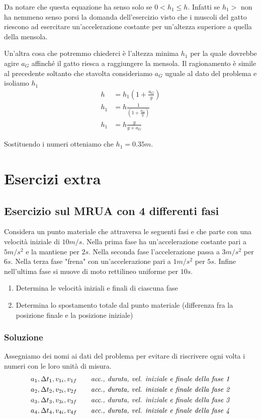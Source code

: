 \documentclass{article}
\begin{document}
Da notare che questa equazione ha senso solo se $0 < h_1 \le h$. Infatti se $h_1 >$ non ha nemmeno senso porsi la domanda dell'esercizio visto che i muscoli del gatto riescono ad esercitare un'accelerazione costante per un'altezza superiore a quella della mensola.

Un'altra cosa che potremmo chiederci è l'altezza minima $h_1$ per la quale dovrebbe agire $a_G$ affinché il gatto riesca a raggiungere la mensola. Il ragionamento è simile al precedente soltanto che stavolta consideriamo $a_G$ uguale al dato del problema e isoliamo $h_1$
\begin{align}
  h &= h_1\left(1+\frac{a_G}{g}\right) \\
  h_1 &= h \frac{1}{\left(1+\frac{a_G}{g}\right)} \\
  h_1 &= h \frac{g}{g+a_G}
\end{align}

Sostituendo i numeri otteniamo che $h_1=0.35m$.

\newpage
\section{Esercizi extra}

\subsection{Esercizio sul MRUA con 4 differenti fasi}
Considera un punto materiale che attraversa le seguenti fasi e che parte con una velocità iniziale di $10m/s$. 
Nella prima fase ha un'accelerazione costante pari a $5m/s^2$ e la mantiene per $2s$. Nella seconda fase l'accelerazione passa a $3m/s^2$ per $6s$. Nella terza fase "frena" con un'accelerazione pari a $1m/s^2$ per $5s$. Infine nell'ultima fase si muove di moto rettilineo uniforme per $10s$.
\begin{enumerate}
  \item Determina le velocità iniziali e finali di ciascuna fase
  \item Determina lo spostamento totale dal punto materiale (differenza fra la posizione finale e la posizione iniziale)
\end{enumerate}

\subsubsection{Soluzione}

Assegniamo dei nomi ai dati del problema per evitare di riscrivere ogni volta i numeri con le loro unità di misura. 
\begin{align}
  & a_1, \Delta t_1, v_{1i}, v_{1f} \qquad \text{\textit{acc., durata, vel. iniziale e finale della fase 1}} \\
  & a_2, \Delta t_2, v_{2i}, v_{2f} \qquad \text{\textit{acc., durata, vel. iniziale e finale della fase 2}} \\
  & a_3, \Delta t_3, v_{3i}, v_{3f} \qquad \text{\textit{acc., durata, vel. iniziale e finale della fase 3}} \\
  & a_4, \Delta t_4, v_{4i}, v_{4f} \qquad \text{\textit{acc., durata, vel. iniziale e finale della fase 4}}
\end{align}
\end{document}
